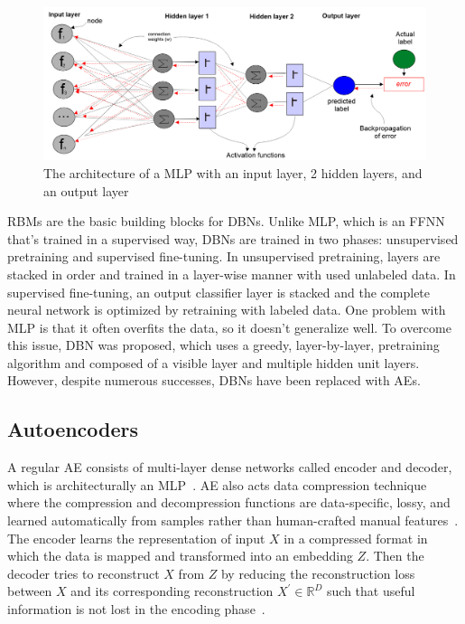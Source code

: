 \begin{figure}[h]
    \centering
    \includegraphics[scale=0.7]{images/ffnn_1.png}
    \caption[Architecture of multilayer perceptron~(MLP)]{The architecture of a MLP with an input layer, 2 hidden layers, and an output layer}
    \label{fig:mlp_1}
\end{figure}

\hspace*{3.5mm} RBMs are the basic building blocks for DBNs. Unlike MLP, which is an FFNN that's trained in a supervised way, DBNs are trained in two phases: unsupervised pretraining and supervised fine-tuning. In unsupervised pretraining, layers are stacked in order and trained in a layer-wise manner with used unlabeled data. In supervised fine-tuning, an output classifier layer is stacked and the complete neural network is optimized by retraining with labeled data. One problem with MLP is that it often overfits the data, so it doesn't generalize well. To overcome this issue, DBN was proposed, which uses a greedy, layer-by-layer, pretraining algorithm and composed of a visible layer and multiple hidden unit layers. However, despite numerous successes, DBNs have been replaced with AEs. 

\subsection{Autoencoders}
\label{preli:AEs}
A regular AE consists of multi-layer dense networks called encoder and decoder, which is architecturally an MLP~\cite{karimDLTF2018}. AE also acts data compression technique where the compression and decompression functions are data-specific, lossy, and learned automatically from samples rather than human-crafted manual features~\cite{karimDLTF2018}. The encoder learns the representation of input $X$ in a compressed format in which the data is mapped and transformed into an embedding $Z$.  
Then the decoder tries to reconstruct $X$ from $Z$ by reducing the reconstruction loss between $X$ and its corresponding reconstruction $X^{\prime} \in \mathbb{R}^{D}$ such that useful information is not lost in the encoding phase~\cite{KarimIEEEAccess2019}.

